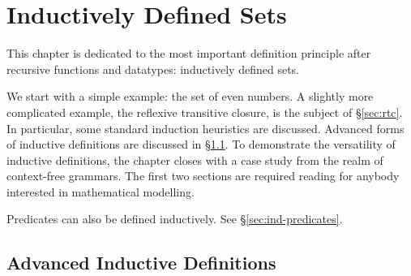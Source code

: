 \chapter{Inductively Defined Sets} \label{chap:inductive}

This chapter is dedicated to the most important definition principle after
recursive functions and datatypes: inductively defined sets.

We start with a simple example: the set of even numbers.  A slightly more
complicated example, the reflexive transitive closure, is the subject of
{\S}\ref{sec:rtc}. In particular, some standard induction heuristics are
discussed. Advanced forms of inductive definitions are discussed in
{\S}\ref{sec:adv-ind-def}. To demonstrate the versatility of inductive
definitions, the chapter closes with a case study from the realm of
context-free grammars. The first two sections are required reading for anybody
interested in mathematical modelling.

\begin{warn}
Predicates can also be defined inductively.
See {\S}\ref{sec:ind-predicates}.
\end{warn}





\section{Advanced Inductive Definitions}
\label{sec:adv-ind-def}





